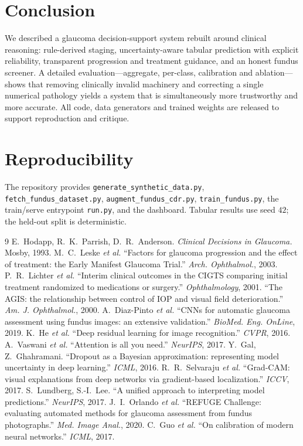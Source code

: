 \documentclass[10pt,twocolumn]{article}
\begin{document}
\section{Conclusion}
We described a glaucoma decision-support system rebuilt around clinical reasoning:
rule-derived staging, uncertainty-aware tabular prediction with explicit reliability,
transparent progression and treatment guidance, and an honest fundus screener. A
detailed evaluation---aggregate, per-class, calibration and ablation---shows that
removing clinically invalid machinery and correcting a single numerical pathology
yields a system that is simultaneously more trustworthy and more accurate. All code,
data generators and trained weights are released to support reproduction and
critique.

\section*{Reproducibility}
The repository provides \texttt{generate\_synthetic\_data.py},
\texttt{fetch\_fundus\_dataset.py}, \texttt{augment\_fundus\_cdr.py},
\texttt{train\_fundus.py}, the train/serve entrypoint \texttt{run.py}, and the
dashboard. Tabular results use seed $42$; the held-out split is deterministic.

\begin{thebibliography}{9}
\small
{} E.~Hodapp, R.~K.~Parrish, D.~R.~Anderson.
\textit{Clinical Decisions in Glaucoma.} Mosby, 1993.
 M.~C.~Leske \textit{et al.}
``Factors for glaucoma progression and the effect of treatment: the Early Manifest
Glaucoma Trial.'' \textit{Arch. Ophthalmol.}, 2003.
 P.~R.~Lichter \textit{et al.}
``Interim clinical outcomes in the CIGTS comparing initial treatment randomized to
medications or surgery.'' \textit{Ophthalmology}, 2001.
 ``The AGIS: the relationship between control of IOP and visual field
deterioration.'' \textit{Am. J. Ophthalmol.}, 2000.
 A.~Diaz-Pinto \textit{et al.}
``CNNs for automatic glaucoma assessment using fundus images: an extensive
validation.'' \textit{BioMed. Eng. OnLine}, 2019.
 K.~He \textit{et al.}
``Deep residual learning for image recognition.'' \textit{CVPR}, 2016.
 A.~Vaswani \textit{et al.}
``Attention is all you need.'' \textit{NeurIPS}, 2017.
 Y.~Gal, Z.~Ghahramani.
``Dropout as a Bayesian approximation: representing model uncertainty in deep
learning.'' \textit{ICML}, 2016.
 R.~R.~Selvaraju \textit{et al.}
``Grad-CAM: visual explanations from deep networks via gradient-based
localization.'' \textit{ICCV}, 2017.
 S.~Lundberg, S.-I.~Lee.
``A unified approach to interpreting model predictions.'' \textit{NeurIPS}, 2017.
 J.~I.~Orlando \textit{et al.}
``REFUGE Challenge: evaluating automated methods for glaucoma assessment from fundus
photographs.'' \textit{Med. Image Anal.}, 2020.
 C.~Guo \textit{et al.}
``On calibration of modern neural networks.'' \textit{ICML}, 2017.
\end{thebibliography}
\end{document}
